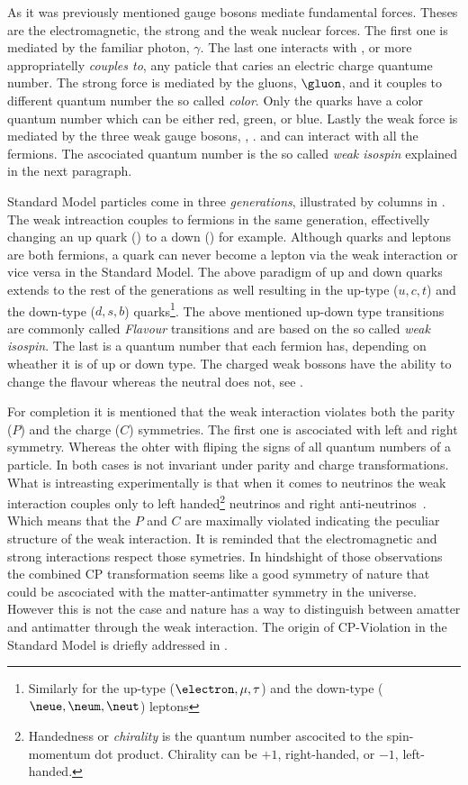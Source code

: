 As it was previously mentioned gauge bosons mediate fundamental forces. Theses are the electromagnetic, the strong and the weak nuclear forces.
The first one is mediated by the familiar photon, $\gamma$. The last one interacts with , or more appropriatelly {\it couples to}, any paticle that
caries an electric charge quantume number. The strong force is mediated by the gluons, $\gluon$, and it couples to different quantum number the so
called {\it color}. Only the quarks have a color quantum number which can be either red, green, or blue. Lastly the weak force is mediated
by the three weak gauge bosons, \Wpm, \Z. and can interact with all the fermions. The ascociated quantum number is the so called {\it weak isospin}
explained in the next paragraph.

Standard Model particles come in three {\it generations}, illustrated by columns in .
The weak intreaction couples to fermions in the same generation, effectivelly changing an up quark (\uquark) to a down (\dquark) for example.
Although quarks and leptons are both fermions, a quark can never become a lepton via the weak interaction or vice versa in the Standard Model.
The above paradigm of up and down quarks extends to the rest of the generations as well resulting in the up-type ($u,c,t$) and the down-type ($d,s,b$)
quarks\footnote{Similarly for the  up-type ($\electron,\mu,\tau$) and the down-type ($\neue,\neum,\neut$) leptons}. The above mentioned up-down type
transitions are commonly called {\it Flavour} transitions
and are based on the so called {\it weak isospin}. The last is a quantum number that each fermion has, depending on
wheather it is of up or down type. The charged weak bossons \Wpm have the ability to change the flavour whereas the neutral \Z  does not, see .

For completion it is mentioned that the weak interaction violates both the parity ($P$) and the charge ($C$) symmetries.
The first one is ascociated with left and right symmetry. Whereas the ohter with fliping the signs of all quantum numbers of a particle.
In both cases  is not invariant under parity and charge transformations. What is intreasting experimentally
is that when it comes to neutrinos the weak interaction couples only to left handed\footnote{Handedness or {\it chirality} is the quantum number ascocited to the spin-momentum dot product.
Chirality can be $+1$, right-handed,  or $-1$, left-handed. } neutrinos and right anti-neutrinos~\cite{wu-parity,garwin-parity}.
Which means that the $P$ and $C$ are maximally violated indicating the peculiar structure of the weak interaction. It is reminded that
the electromagnetic and strong interactions respect those symetries. In hindshight of those observations the combined CP transformation
seems like a good symmetry of nature that could be ascociated with the matter-antimatter symmetry in the universe.
However this is not the case and nature has a way to distinguish between amatter and antimatter through the weak interaction.
The origin of CP-Violation in the Standard Model is driefly addressed in .


